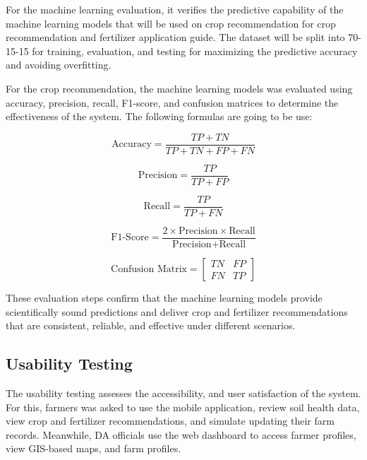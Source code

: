 {	For the machine learning evaluation, it verifies the predictive capability of the machine learning models that will be used on crop recommendation for crop recommendation and fertilizer application guide. The dataset will be split into 70-15-15 for training, evaluation, and testing for maximizing the predictive accuracy and avoiding overfitting. 
	
	For the crop recommendation, the machine learning models was evaluated using accuracy, precision, recall, F1-score, and confusion matrices to determine the effectiveness of the system. The following formulas are going to be use:
	
	\begin{equation}
		\text{Accuracy} = \frac{TP + TN}{TP + TN + FP + FN}
		\label{eq:accuracy}
	\end{equation}
	
	\begin{equation}
		\text{Precision} = \frac{TP}{TP + FP}
		\label{eq:precision}
	\end{equation}
	
	\begin{equation}
		\text{Recall} = \frac{TP}{TP + FN}
		\label{eq:recall}
	\end{equation}
	
	\begin{equation}
		\text{F1-Score} = \frac{2 \times \text{Precision} \times \text{Recall}}{\text{Precision} + \text{Recall}}
		\label{eq:f1score}
	\end{equation}
	
	\begin{equation}
		\text{Confusion Matrix} = 
		\begin{bmatrix}
			TN & FP \\
			FN & TP
		\end{bmatrix}
		\label{eq:confusionmatrix}
	\end{equation}
	
	
	These evaluation steps confirm that the machine learning models provide scientifically sound predictions and deliver crop and fertilizer recommendations that are consistent, reliable, and effective under different scenarios.
	
	\subsection{Usability Testing}
	The usability testing assesses the accessibility, and user satisfaction of the system. For this, farmers was asked to use the mobile application, review soil health data, view crop and fertilizer recommendations, and simulate updating their farm records. Meanwhile, DA officials use the web dashboard to access farmer profiles, view GIS-based maps, and farm profiles.
	
}
